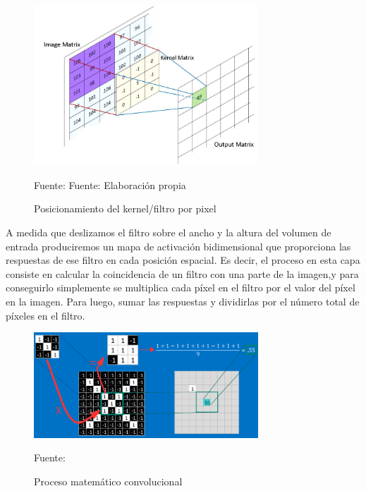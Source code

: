 		\begin{figure}[H]
		\begin{center}
		\includegraphics[width=0.75\textwidth]{images/marcoteorico/Convolution_calculation1}
		\end{center}
		\begin{center}
		\caption{\small{Posicionamiento del kernel/filtro por pixel}}
		{\small{Fuente: Fuente: Elaboración propia}}
		\end{center}
		\vspace{-1.9em}
		\end{figure}

		A medida que deslizamos el filtro sobre el ancho y la altura del volumen de entrada produciremos un mapa de activación bidimensional que proporciona las respuestas de ese filtro en cada posición espacial. Es decir, el proceso en esta capa consiste en calcular la coincidencia de un filtro con una parte de la imagen,y para conseguirlo simplemente se multiplica cada píxel en el filtro por el valor del píxel en la imagen. Para luego, sumar las respuestas y dividirlas por el número total de píxeles en el filtro.

		\begin{figure}[H]
		\begin{center}
		\includegraphics[width=0.75\textwidth]{images/marcoteorico/conv_filt1}
		\end{center}
		\begin{center}
		\caption{\small{Proceso matemático convolucional}}
		{\small{Fuente:\cite{Rohrer}}}
		\end{center}
		\vspace{-1.5em}
		\end{figure}

